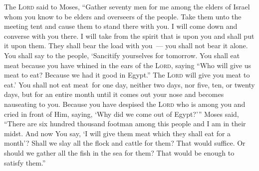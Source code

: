 \begin{inparaenum}
     The \textsc{Lord} said to Moses, ``Gather seventy men for me among the elders of Israel whom you know to be elders and overseers of the people. Take them unto the meeting tent and cause them to stand there with you.%
     I will come down and converse with you there. I will take from the spirit that is upon you and shall put it upon them. They shall bear the load with you~--- you shall not bear it alone.%
     You shall say to the people, `Sancitify yourselves for tomorrow. You shall eat meat because you have whined in the ears of the \textsc{Lord}, saying ``Who will give us meat to eat? Because we had it good in Egypt.'' The \textsc{Lord} will give you meat to eat.'%
     You shall not eat meat\understood\ for one day, neither two days, nor five, ten, or twenty days,%
     but for an entire month until it comes out your nose and becomes nauseating to you. Because you have despised the \textsc{Lord} who is among you and cried in front of Him, saying, `Why did we come out of Egypt?'\thinspace''%
     Moses said, ``There are six hundred thousand footman among this people and I am in their midst. And now You say, `I will give them meat which they shall eat for a month'?%
     Shall we slay all the flock and cattle for them? That would suffice. Or should we gather all the fish in the sea for them? That would be enough to satisfy them.''%
    

\end{inparaenum}

